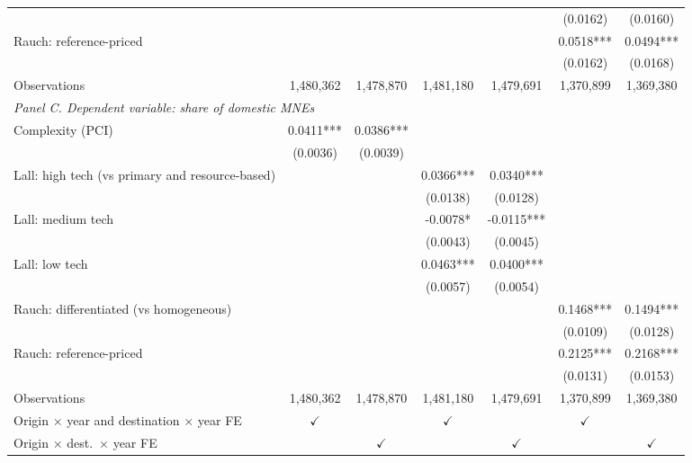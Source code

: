 \begin{tabular}{lcccccc}
 &  &  &  &  & (0.0162) & (0.0160) \\
Rauch: reference-priced &  &  &  &  & 0.0518*** & 0.0494*** \\
 &  &  &  &  & (0.0162) & (0.0168) \\
Observations & 1,480,362 & 1,478,870 & 1,481,180 & 1,479,691 & 1,370,899 & 1,369,380 \\
\midrule
\multicolumn{7}{l}{\textit{Panel C. Dependent variable: share of domestic MNEs}} \\
Complexity (PCI) & 0.0411*** & 0.0386*** &  &  &  &  \\
 & (0.0036) & (0.0039) &  &  &  &  \\
Lall: high tech (vs primary and resource-based) &  &  & 0.0366*** & 0.0340*** &  &  \\
 &  &  & (0.0138) & (0.0128) &  &  \\
Lall: medium tech &  &  & -0.0078* & -0.0115*** &  &  \\
 &  &  & (0.0043) & (0.0045) &  &  \\
Lall: low tech &  &  & 0.0463*** & 0.0400*** &  &  \\
 &  &  & (0.0057) & (0.0054) &  &  \\
Rauch: differentiated (vs homogeneous) &  &  &  &  & 0.1468*** & 0.1494*** \\
 &  &  &  &  & (0.0109) & (0.0128) \\
Rauch: reference-priced &  &  &  &  & 0.2125*** & 0.2168*** \\
 &  &  &  &  & (0.0131) & (0.0153) \\
Observations & 1,480,362 & 1,478,870 & 1,481,180 & 1,479,691 & 1,370,899 & 1,369,380 \\
\hline
Origin $\times$ year and destination $\times$ year FE & $\checkmark$ &  & $\checkmark$ &  & $\checkmark$ &  \\
Origin $\times$ dest.\ $\times$ year FE &  & $\checkmark$ &  & $\checkmark$ &  & $\checkmark$ \\
\hline
\end{tabular}
